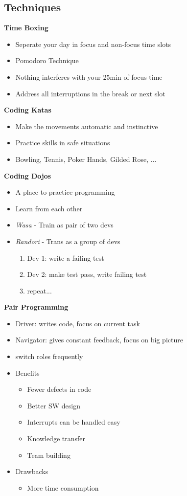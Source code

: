 \subsection{Techniques}
\textbf{Time Boxing}
\begin{itemize}
    \item Seperate your day in focus and non-focus time slots
    \item Pomodoro Technique
    \item Nothing interferes with your 25min of focus time
    \item Address all interruptions in the break or next slot
\end{itemize}
\textbf{Coding Katas}
\begin{itemize}
    \item Make the movements automatic and instinctive
    \item Practice skills in safe situations
    \item Bowling, Tennis, Poker Hands, Gilded Rose, ...
\end{itemize}
\textbf{Coding Dojos}
\begin{itemize}
    \item A place to practice programming
    \item Learn from each other
    \item \textit{Wasa} - Train as pair of two devs
    \item \textit{Randori} - Trans as a group of devs
    \begin{enumerate}
        \item Dev 1: write a failing test
        \item Dev 2: make test pass, write failing test
        \item repeat...
    \end{enumerate}
\end{itemize}
\textbf{Pair Programming}
\begin{itemize}
    \item Driver: writes code, focus on current task
    \item Navigator: gives constant feedback, focus on big picture
    \item switch roles frequently
    \item Benefits
    \begin{itemize}
        \item Fewer defects in code
        \item Better SW design
        \item Interrupts can be handled easy
        \item Knowledge transfer
        \item Team building
    \end{itemize}
    \item Drawbacks
    \begin{itemize}
        \item More time consumption
    \end{itemize}
\end{itemize}
